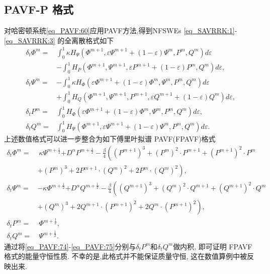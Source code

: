 \subsection{PAVF-P 格式}
对哈密顿系统\eqref{eq_PAVF:60}应用PAVF方法,得到NFSWEs \eqref{eq_SAVRRK:1}-\eqref{eq_SAVRRK:3} 的全离散格式如下
\begin{align}
\delta_{t} \varPhi^{m}=&\int_{0}^{1}\kappa H_{\Psi}\left(\varPhi^{m+1}, \varepsilon \Psi^{m+1}+(1-\varepsilon) \Psi^{m}, P^{m}, Q^{m}\right)d \varepsilon\nonumber\\
&-\int_{0}^{1}H_{P}\left(\varPhi^{m+1}, \Psi^{m+1}, \varepsilon P^{m+1}+(1-\varepsilon) P^{m}, Q^{m}\right)d \varepsilon,\label{eq_PAVF:70}\\
\delta_{t} \Psi^{m}=&-\int_{0}^{1}\kappa H_{\varPhi}\left(\varepsilon \varPhi^{m+1}+(1-\varepsilon) \varPhi^{m}, \Psi^{m}, P^{m}, Q^{m}\right)d \varepsilon\nonumber\\
&+\int_{0}^{1}H_{Q}\left(\varPhi^{m+1}, \Psi^{m+1}, P^{m+1}, \varepsilon Q^{m+1}+(1-\varepsilon) Q^{m}\right)d\varepsilon,\label{eq_PAVF:71}\\
\delta_{t} P^{m}=&\int_{0}^{1}H_{\varPhi}\left(\varepsilon \varPhi^{m+1}+(1-\varepsilon) \varPhi^{m}, \Psi^{m}, P^{m}, Q^{m}\right) d \varepsilon,\label{eq_PAVF:72}\\
\delta_{t} Q^{m}=&\int_{0}^{1}H_{\Psi}\left(\varPhi^{m+1}, \varepsilon \Psi^{m+1}+(1-\varepsilon) \Psi^{m}, P^{m}, Q^{m}\right) d \varepsilon.\label{eq_PAVF:73}
\end{align}
上述数值格式可以进一步整合为如下傅里叶拟谱 PAVF(FPAVF)格式
\begin{align}
\delta_{t} \varPhi^{m}=&~\kappa \Psi^{m+\frac{1}{2}}{+D^{\alpha} P^{m+\frac{1}{2}}}-\frac{\beta}{4}\left( (P^{m+1})^3+ (P^{m})^{2}\cdot P^{m+1}+(P^{m+1})^{2}\cdot P^{m}\right.\nonumber\\
	&+\left. (P^{m})^{3}+2 P^{m+1}\cdot (Q^{m})^{2}+2 P^{m}\cdot (Q^{m})^{2}\right),\label{eq_PAVF:74}\\
\delta_{t} \Psi^{m}=&-\kappa \varPhi^{m+\frac{1}{2}}{+D^{\alpha} Q^{m+\frac{1}{2}}}-\frac{\beta}{4}\left( (Q^{m+1})^3+ (Q^{m})^{2}\cdot Q^{m+1}+(Q^{m+1})^{2}\cdot Q^{m}\right.\nonumber\\
	&+\left. (Q^{m})^{3}+2 Q^{m+1}\cdot (P^{m+1})^{2}+2 Q^{m}\cdot (P^{m+1})^{2}\right),\label{eq_PAVF:75}\\
\delta_{t} P^{m}=&~\varPhi^{m+\frac{1}{2}},\label{eq_PAVF:76}\\
\delta_{t} Q^{m}=&~\Psi^{m+\frac{1}{2}}.\label{eq_PAVF:77}
\end{align}
通过将\eqref{eq_PAVF:74}-\eqref{eq_PAVF:75}分别与$\delta_t P^{m}$和$\delta_t Q^{m}$做内积, 即可证明 FPAVF 格式的能量守恒性质.
不幸的是,此格式并不能保证质量守恒, 这在数值算例中被反映出来.

